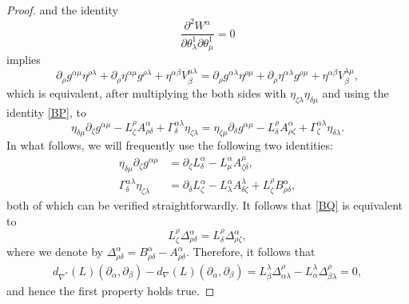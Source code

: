\documentclass[11pt,a4paper]{amsart}
\numberwithin{equation}{section}
\newcommand{\qa}{\alpha}
\newcommand{\qb}{\beta}
\newcommand{\qd}{\delta}
\newcommand{\qth}{\theta}
\newcommand{\qz}{\zeta}
\newcommand{\qp}{\partial}
\newcommand{\Qg}{\Gamma}
\newcommand{\ql}{\lambda}
\newcommand{\Qd}{\Delta}
\numberwithin{equation}{section}
\begin{document}
\begin{proof}
and the identity 
\[
\frac{\qp^2 W^\qa}{\qp\qth_\ql^1\qp\qth_\mu^1} = 0
\]
implies 
\begin{equation*}
\qp_\rho g^{\qa\mu}\eta^{\rho\ql}+\qp_\rho\eta^{\qa\mu}g^{\rho\ql}+\eta^{\qa\qb}V^{\mu\ql}_\qb = 
\qp_\rho g^{\qa\ql}\eta^{\rho\mu}+\qp_\rho \eta^{\qa\ql}g^{\rho\mu}+\eta^{\qa\qb}V^{\ql\mu}_\qb,
\end{equation*}
which is equivalent, after multiplying the both sides with $\eta_{\qz\ql}\eta_{\qd\mu}$ and using the identity \eqref{BP}, to 
\begin{equation}
    \label{BQ}
\eta_{\qd\mu}\qp_\qz g^{\qa\mu}-L^\rho_\qz A^\qa_{\rho\qd}+\Qg^{\qa\ql}_\qd\eta_{\qz\ql} = \eta_{\qz\mu}\qp_\qd g^{\qa\mu}-L^\rho_\qd A^\qa_{\rho\qz}+\Qg^{\qa\ql}_\qz\eta_{\qd\ql}. 
\end{equation}
In what follows, we will frequently use the following two identities:
\begin{align}
  \label{DA}
\eta_{\qd\mu}\qp_\qz g^{\qa\mu}&=\qp_\qz L^\qa_\qd - L^\qa_\mu A^\mu_{\qz\qd},\\
\label{DB}
\Qg^{\qa\ql}_\qd\eta_{\qz\ql}&=\qp_\qd L^\qa_\qz-L^\qa_\ql A^\ql_{\qd\qz}+L^\rho_\qz B^\qa_{\rho\qd},
\end{align}
both of which can be verified straightforwardly. It follows that \eqref{BQ} is equivalent to 
\begin{equation}
  \label{BR}
  L^\rho_\qz \Qd^\qa_{\rho\qd} = L^\rho_\qd \Qd^\qa_{\rho\qz}, 
\end{equation}
where we denote by $\Qd^\qa_{\rho\qd} = B^\qa_{\rho\qd}-A^\qa_{\rho\qd}$. Therefore, it follows that 
\begin{align*}
  d_{\nabla^*}(L)(\qp_\qa,\qp_\qb)-d_{\nabla}(L)(\qp_\qa,\qp_\qb) = L^\ql_\qb \Qd^\rho_{\qa\ql}-L^\ql_\qa \Qd^\rho_{\qb\ql} = 0,
\end{align*}
and hence the first property holds true.


\end{proof}
\end{document}
